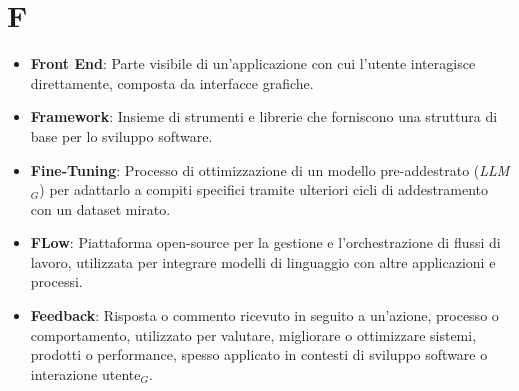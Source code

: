 \section{F}
\begin{itemize}
    \item \textbf{Front End}: Parte visibile di un'applicazione con cui l'utente interagisce direttamente, composta da interfacce grafiche.
    \item \textbf{Framework}: Insieme di strumenti e librerie che forniscono una struttura di base per lo sviluppo software.
    \item \textbf{Fine-Tuning}: Processo di ottimizzazione di un modello pre-addestrato (\textit{LLM}$_G$) per adattarlo a compiti specifici tramite ulteriori cicli di addestramento con un dataset mirato.
    \item \textbf{FLow}: Piattaforma open-source per la gestione e l'orchestrazione di flussi di lavoro, utilizzata per integrare modelli di linguaggio con altre applicazioni e processi.
    \item \textbf{Feedback}: Risposta o commento ricevuto in seguito a un'azione, processo o comportamento, utilizzato per valutare, migliorare o ottimizzare sistemi, prodotti o performance, spesso applicato in contesti di sviluppo software o interazione utente$_G$.

\end{itemize}
